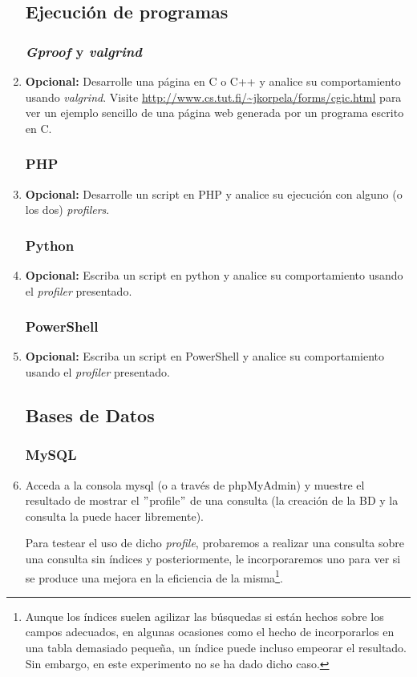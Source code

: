 \documentclass[paper=a4, fontsize=11pt]{scrartcl} %
\numberwithin{equation}{section} %
\numberwithin{figure}{section} %
\numberwithin{table}{section} %
\begin{document}
\begin{enumerate}
	\subsection{Ejecución de programas}
	\subsubsection{\textit{Gproof} y \textit{valgrind}}
		\item \textbf{Opcional:} Desarrolle una página en C o C++ y analice su comportamiento usando
		\textit{valgrind}. Visite \url{http://www.cs.tut.fi/~jkorpela/forms/cgic.html} para ver un
		ejemplo sencillo de una página web generada por un programa escrito en C.
		
	\subsubsection{PHP}
		\item \textbf{Opcional:} Desarrolle un script en PHP y analice su ejecución con alguno (o
		los dos) \textit{profilers}.
		
	\subsubsection{Python}
		\item \textbf{Opcional:} Escriba un script en python y analice su comportamiento usando el
		\textit{profiler} presentado.
		
	\subsubsection{PowerShell}
		\item \textbf{Opcional:} Escriba un script en PowerShell y analice su comportamiento
		usando el \textit{profiler} presentado.
		
	\subsection{Bases de Datos}
	\subsubsection{MySQL}
		\item Acceda a la consola mysql (o a través de phpMyAdmin) y muestre el resultado de mostrar
		el $"$profile$"$ de una consulta (la creación de la BD y la consulta la puede hacer libremente).
		
		Para testear el uso de dicho \textit{profile}, probaremos a realizar una consulta sobre una
		consulta sin índices y posteriormente, le incorporaremos uno para ver si se produce una mejora
		en la eficiencia de la misma\footnote{Aunque los índices suelen agilizar las búsquedas si están
		hechos sobre los campos adecuados, en algunas ocasiones como el hecho de incorporarlos en una
		tabla demasiado pequeña, un índice puede incluso empeorar el resultado. Sin embargo, en este
		experimento no se ha dado dicho caso.}.
		

\end{enumerate}
\end{document}

